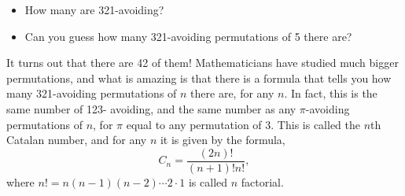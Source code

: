 \begin{itemize}
\item How many are 321-avoiding?
\item Can you guess how many 321-avoiding permutations of 5 there are?
\end{itemize}


It turns out that there are 42 of them! Mathematicians have studied much bigger permutations, and what is amazing is that there is a formula that tells you how many 321-avoiding permutations of $n$ there are, for any $n$. In fact, this is the same number of 123- avoiding, and the same number as any $\pi$-avoiding permutations of $n$, for $\pi$ equal to any permutation of 3. This is called the $n$th Catalan number, and for any $n$ it is given by the formula,
	\[
	C_n= \dfrac{(2n)!}{(n+1)!n!},
	\]
where $n!= n(n-1)(n-2)\cdots 2 \cdot 1$ is called $n$ factorial. 
